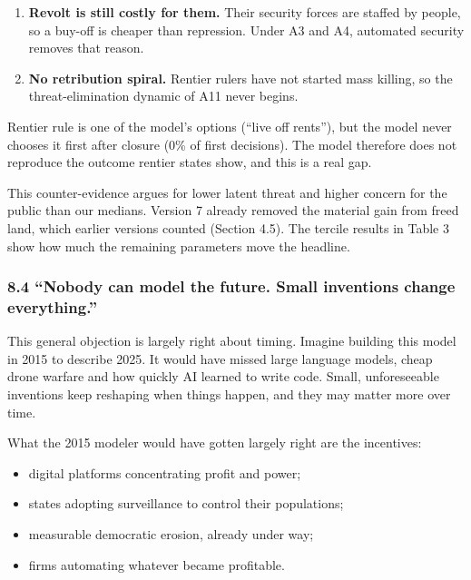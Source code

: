 \documentclass[
  10pt,
]{article}
\providecommand{\tightlist}{%
  \setlength{\itemsep}{0pt}\setlength{\parskip}{0pt}}
\begin{document}
\begin{enumerate}
\def\labelenumi{\arabic{enumi}.}
\tightlist
\item
  \textbf{Revolt is still costly for them.} Their security forces are staffed by people, so a
  buy-off is cheaper than repression. Under A3 and A4, automated security removes that reason.
\item
  \textbf{No retribution spiral.} Rentier rulers have not started mass killing, so the
  threat-elimination dynamic of A11 never begins.
\end{enumerate}

Rentier rule is one of the model's options (``live off rents''), but the model never chooses it
first after closure (0\% of first decisions). The model therefore does not reproduce the outcome
rentier states show, and this is a real gap.

This counter-evidence argues for lower latent threat and higher concern for the public than our
medians. Version 7 already removed the material gain from freed land, which earlier versions counted
(Section 4.5). The tercile results in Table 3 show how much the remaining parameters move the
headline.

\subsubsection{8.4 ``Nobody can model the future. Small inventions change
everything.''}\label{nobody-can-model-the-future.-small-inventions-change-everything.}

This general objection is largely right about timing. Imagine building this model in 2015 to
describe 2025. It would have missed large language models, cheap drone warfare and how quickly AI
learned to write code. Small, unforeseeable inventions keep reshaping when things happen, and they
may matter more over time.

What the 2015 modeler would have gotten largely right are the incentives:

\begin{itemize}
\tightlist
\item
  digital platforms concentrating profit and power;
\item
  states adopting surveillance to control their populations;
\item
  measurable democratic erosion, already under way;
\item
  firms automating whatever became profitable.
\end{itemize}
\end{document}
